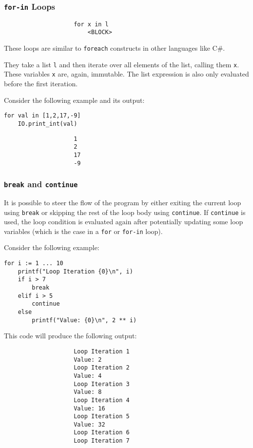 \documentclass{article}
\newcommand{\code}[1]{\lstinline[columns=fixed]{#1}}
\begin{document}
			\subsubsection{\code{for-in} Loops}
			
				\begin{verbatim}
					for x in l
						<BLOCK>
				\end{verbatim}
			
				These loops are similar to \texttt{foreach} constructs in other languages like C\#.
				
				They take a list \code{l} and then iterate over all elements of the list, calling them \code{x}. These variables \code{x} are, again, immutable. The list expression is also only evaluated before the first iteration.
				
				Consider the following example and its output:
				
				\begin{lstlisting}
for val in [1,2,17,-9]
	IO.print_int(val)
				\end{lstlisting}
				
				\begin{verbatim}
					1
					2
					17
					-9
				\end{verbatim}
				
			\subsubsection{\code{break} and \code{continue}}
			
				It is possible to steer the flow of the program by either exiting the current loop using \code{break} or skipping the rest of the loop body using \code{continue}. If \code{continue} is used, the loop condition is evaluated again after potentially updating some loop variables (which is the case in a \code{for} or \code{for-in} loop).
				
				Consider the following example:
				
				\begin{lstlisting}
for i := 1 ... 10
	printf("Loop Iteration {0}\n", i)
	if i > 7
		break
	elif i > 5
		continue
	else
		printf("Value: {0}\n", 2 ** i)
				\end{lstlisting}
				
				This code will produce the following output:
				
				\begin{verbatim}
					Loop Iteration 1
					Value: 2
					Loop Iteration 2
					Value: 4
					Loop Iteration 3
					Value: 8
					Loop Iteration 4
					Value: 16
					Loop Iteration 5
					Value: 32
					Loop Iteration 6
					Loop Iteration 7
				\end{verbatim}
		
\end{document}
